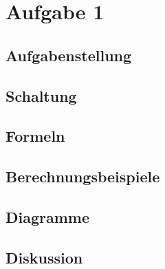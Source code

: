 \documentclass[12pt,a4paper,ngerman]{article}
\begin{document}


%
%

\section{Aufgabe 1}
\subsection{Aufgabenstellung}

\subsection{Schaltung}
\subsection{Formeln}
\subsection{Berechnungsbeispiele}
\subsection{Diagramme}
\subsection{Diskussion}


 



   
\end{document}
